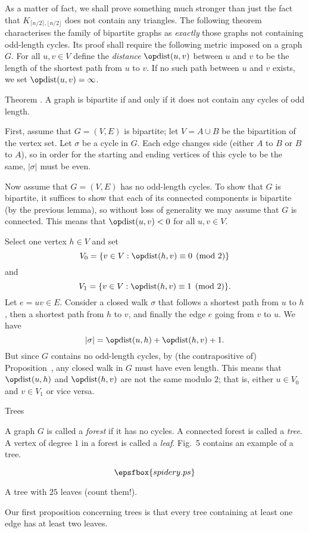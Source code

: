As a matter of fact, we shall prove something much stronger than just the fact that
$K_{\lceil n/2 \rceil, \lfloor n/2 \rfloor}$ does not contain any triangles.
The following theorem characterises the family of bipartite graphs as {\it exactly} those graphs not
containing odd-length cycles.
Its proof shall require the following metric imposed on a graph $G$. For all $u,v\in V$
define the {\it distance} $\dist(u,v)$ between $u$ and $v$ to be the length of the shortest path
from $u$ to $v$. If no such path between $u$ and $v$ exists, we set $\dist(u,v) = \infty$.

\proclaim Theorem \advthm. A graph is bipartite if and only if it does not
contain any cycles of odd length.

\proof First, assume that $G=(V,E)$ is bipartite; let $V = A\cup B$ be the bipartition
of the vertex set. Let $\sigma$ be a cycle in $G$. Each edge changes side (either
$A$ to $B$ or $B$ to $A$), so in order for the starting and ending vertices of this
cycle to be the same, $|\sigma|$ must be even.

Now assume that $G = (V,E)$ has no odd-length cycles. To show that $G$ is bipartite,
it suffices to show that each of its connected components is bipartite (by the
previous lemma), so without
loss of generality we may assume that $G$ is connected.
This means that $\dist(u,v)< 0$ for all $u,v\in V$.

Select one vertex $h\in V$ and set
$$ V_0 = \{v\in V : \dist(h,v)\equiv 0\pmod 2\}$$
and
$$ V_1 = \{v\in V : \dist(h,v)\equiv 1\pmod 2\}.$$
Let $e = uv\in E$.
Consider a closed walk $\sigma$ that follows a shortest path from $u$ to $h$, then a shortest
path from $h$ to $v$, and finally the edge $e$ going from $v$ to $u$. We have
$$|\sigma| = \dist(u,h) + \dist(h,v) + 1.$$
But since $G$ contains no odd-length cycles, by (the contrapositive of)
Proposition~{\propoddwalkoddcycle}, any closed walk in $G$ must have even length.
This means that $\dist(u,h)$ and $\dist(h,v)$ are not the same modulo $2$; that is,
either $u\in V_0$ and $v\in V_1$ or vice versa.\slug

\advsect Trees

A graph $G$ is called a {\it forest} if it has no cycles. A connected forest is called
a {\it tree}. A vertex of degree $1$ in a forest is called a {\it leaf}. Fig.~5 contains
an example of a tree.

\midinsert
$$\epsfbox{spidery.ps}$$
\vskip5pt
\caption{A tree with $25$ leaves (count them!).}
\endinsert
\goodbreak
Our first proposition
concerning trees is that every tree containing at least one edge has at least two leaves.

